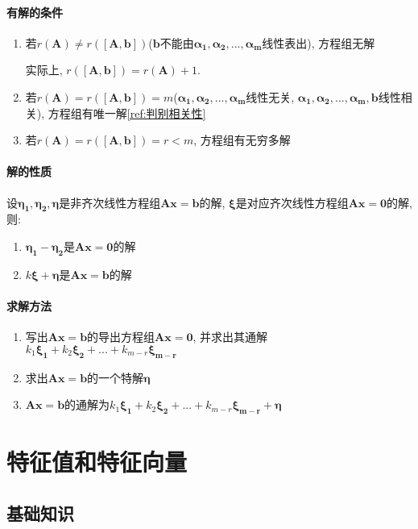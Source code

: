 \subsubsection{有解的条件}
\begin{enumerate}
\item 若$ r(\bm{A})\neq r([\bm{A},\bm{b}]) $($ \bm{b} $不能由$ \bm{\alpha_{1}},\bm{\alpha_{2}},...,\bm{\alpha_{m}} $线性表出), 方程组无解 \par
实际上, $ r([\bm{A},\bm{b}]) = r(\bm{A}) + 1 $.
\item 若$ r(\bm{A})=r([\bm{A},\bm{b}])=m $($ \bm{\alpha_{1}},\bm{\alpha_{2}},...,\bm{\alpha_{m}} $线性无关, $ \bm{\alpha_{1}},\bm{\alpha_{2}},...,\bm{\alpha_{m}},\bm{b} $线性相关), 方程组有唯一解\ref{ref:判别相关性}
\item 若$ r(\bm{A})=r([\bm{A},\bm{b}])=r<m $, 方程组有无穷多解
\end{enumerate}
\subsubsection{解的性质}
设$ \bm{\eta_{1}},\bm{\eta_{2}},\bm{\eta} $是非齐次线性方程组$ \bm{A}\bm{x}=\bm{b} $的解, $ \bm{\xi} $是对应齐次线性方程组$ \bm{A}\bm{x}=\bm{0} $的解, 则:
\begin{enumerate}
\item $ \bm{\eta_{1}}-\bm{\eta_{2}} $是$ \bm{A}\bm{x}=\bm{0} $的解
\item $ k\bm{\xi}+\bm{\eta} $是$ \bm{A}\bm{x}=\bm{b} $的解
\end{enumerate}
\subsubsection{求解方法}
\begin{enumerate}
\item 写出$ \bm{A}\bm{x}=\bm{b} $的导出方程组$ \bm{A}\bm{x}=\bm{0} $, 并求出其通解$ k_{1}\bm{\xi_{1}}+k_{2}\bm{\xi_{2}}+...+k_{m-r}\bm{\xi_{m-r}} $
\item 求出$ \bm{A}\bm{x}=\bm{b} $的一个特解$ \bm{\eta} $
\item $ \bm{A}\bm{x}=\bm{b} $的通解为$ k_{1}\bm{\xi_{1}}+k_{2}\bm{\xi_{2}}+...+k_{m-r}\bm{\xi_{m-r}}+\bm{\eta} $
\end{enumerate}
\chapter{特征值和特征向量}
\section{基础知识}
